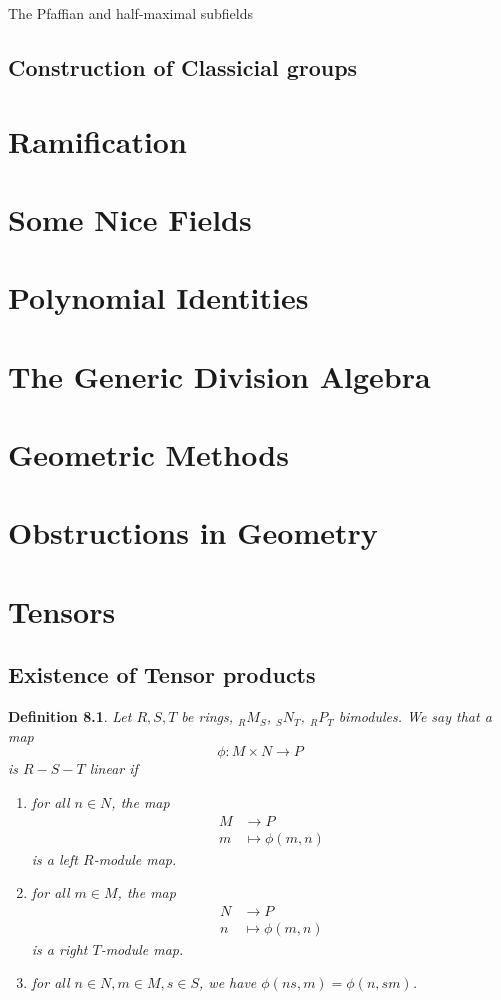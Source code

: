 \documentclass[12pt]{report}
\theoremstyle{plain}
\newtheorem{defn}[thm]{Definition}
\newcommand{\todo}[1]{\textcolor{todo}{#1}}
\begin{document}
\todo{The Pfaffian and half-maximal subfields}

\section{Construction of Classicial groups}

\chapter{Ramification}

\chapter{Some Nice Fields}

\chapter{Polynomial Identities}

\chapter{The Generic Division Algebra}

\chapter{Geometric Methods}

\chapter{Obstructions in Geometry}

\fi

\appendix

\chapter{Tensors}


\section{Existence of Tensor products}

\begin{defn}
Let $R, S, T$ be rings, $_R M_S$, $_S N_T$, $_R P _T$ bimodules. We say
that a map
\[\phi : M \times N \to P\]
is $R-S-T$ linear if
\begin{enumerate}[1. ]
\item for all $n \in N$, the map
\begin{align*}
M &\to P \\
m &\mapsto \phi(m, n)
\end{align*}
is a left $R$-module map.
\item for all $m \in M$, the map
\begin{align*}
N &\to P \\
n &\mapsto \phi(m, n)
\end{align*}
is a right $T$-module map.
\item for all $n \in N, m \in M, s \in S$, we have $\phi(ns, m) = \phi(n,
sm)$.
\end{enumerate}
\end{defn}
\end{document}
